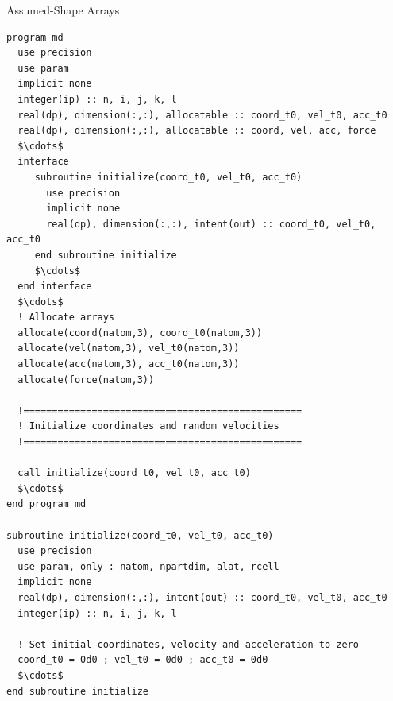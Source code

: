 \documentclass[c,mathserif,compress,xcolor=svgnames]{beamer}
\begin{document}
\begin{frame}[fragile]{Assumed-Shape Arrays}
  \begin{lstlisting}[language={[90]Fortran},basicstyle=\fontsize{4}{5}\selectfont\ttfamily,mathescape]
program md
  use precision
  use param
  implicit none
  integer(ip) :: n, i, j, k, l
  real(dp), dimension(:,:), allocatable :: coord_t0, vel_t0, acc_t0
  real(dp), dimension(:,:), allocatable :: coord, vel, acc, force
  $\cdots$
  interface
     subroutine initialize(coord_t0, vel_t0, acc_t0)
       use precision
       implicit none
       real(dp), dimension(:,:), intent(out) :: coord_t0, vel_t0, acc_t0
     end subroutine initialize
     $\cdots$
  end interface
  $\cdots$
  ! Allocate arrays
  allocate(coord(natom,3), coord_t0(natom,3))
  allocate(vel(natom,3), vel_t0(natom,3))
  allocate(acc(natom,3), acc_t0(natom,3))
  allocate(force(natom,3))

  !=================================================
  ! Initialize coordinates and random velocities
  !=================================================

  call initialize(coord_t0, vel_t0, acc_t0)
  $\cdots$
end program md

subroutine initialize(coord_t0, vel_t0, acc_t0)
  use precision
  use param, only : natom, npartdim, alat, rcell
  implicit none
  real(dp), dimension(:,:), intent(out) :: coord_t0, vel_t0, acc_t0
  integer(ip) :: n, i, j, k, l

  ! Set initial coordinates, velocity and acceleration to zero
  coord_t0 = 0d0 ; vel_t0 = 0d0 ; acc_t0 = 0d0
  $\cdots$
end subroutine initialize
  \end{lstlisting}
\end{frame}
\end{document}
